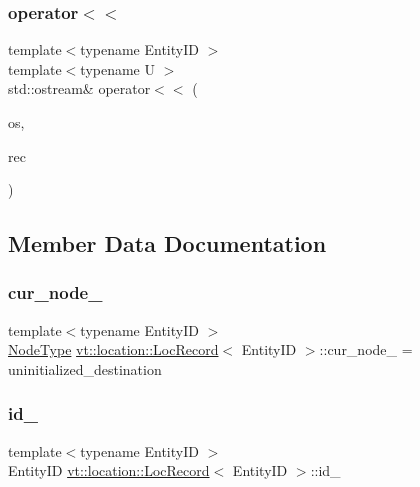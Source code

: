 \subsubsection{\texorpdfstring{operator$<$$<$}{operator<<}}
{\footnotesize\ttfamily template$<$typename Entity\+ID $>$ \\
template$<$typename U $>$ \\
std\+::ostream\& operator$<$$<$ (\begin{DoxyParamCaption}\item[{std\+::ostream \&}]{os,  }\item[{\hyperlink{structvt_1_1location_1_1_loc_record}{Loc\+Record}$<$ U $>$ const \&}]{rec }\end{DoxyParamCaption})\hspace{0.3cm}{\ttfamily [friend]}}



\subsection{Member Data Documentation}
\mbox{\label{structvt_1_1location_1_1_loc_record_aff7390974f2a2c874bde346db67fac13}} 
\subsubsection{\texorpdfstring{cur\+\_\+node\+\_\+}{cur\_node\_}}
{\footnotesize\ttfamily template$<$typename Entity\+ID $>$ \\
\hyperlink{namespacevt_a866da9d0efc19c0a1ce79e9e492f47e2}{Node\+Type} \hyperlink{structvt_1_1location_1_1_loc_record}{vt\+::location\+::\+Loc\+Record}$<$ Entity\+ID $>$\+::cur\+\_\+node\+\_\+ = uninitialized\+\_\+destination\hspace{0.3cm}{\ttfamily [private]}}

\mbox{\label{structvt_1_1location_1_1_loc_record_a165c38a690d7fadd583fa05e9e2b4a25}} 
\subsubsection{\texorpdfstring{id\+\_\+}{id\_}}
{\footnotesize\ttfamily template$<$typename Entity\+ID $>$ \\
Entity\+ID \hyperlink{structvt_1_1location_1_1_loc_record}{vt\+::location\+::\+Loc\+Record}$<$ Entity\+ID $>$\+::id\+\_\+\hspace{0.3cm}{\ttfamily [private]}}

